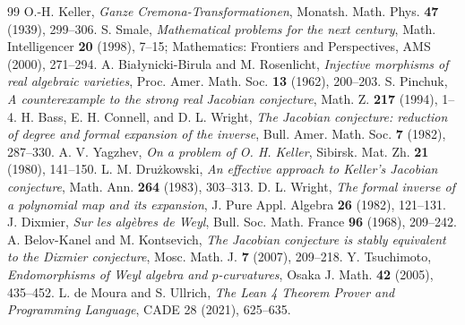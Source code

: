 \documentclass[11pt,a4paper]{article}
\theoremstyle{definition}
\begin{document}
\begin{thebibliography}{99}
 O.-H. Keller, \textit{Ganze Cremona-Transformationen}, Monatsh. Math. Phys. \textbf{47} (1939), 299--306.
 S. Smale, \textit{Mathematical problems for the next century}, Math. Intelligencer \textbf{20} (1998), 7--15; Mathematics: Frontiers and Perspectives, AMS (2000), 271--294.
 A. Bia\l ynicki-Birula and M. Rosenlicht, \textit{Injective morphisms of real algebraic varieties}, Proc. Amer. Math. Soc. \textbf{13} (1962), 200--203.
 S. Pinchuk, \textit{A counterexample to the strong real Jacobian conjecture}, Math. Z. \textbf{217} (1994), 1--4.
 H. Bass, E. H. Connell, and D. L. Wright, \textit{The Jacobian conjecture: reduction of degree and formal expansion of the inverse}, Bull. Amer. Math. Soc. \textbf{7} (1982), 287--330.
 A. V. Yagzhev, \textit{On a problem of O. H. Keller}, Sibirsk. Mat. Zh. \textbf{21} (1980), 141--150.
 L. M. Drużkowski, \textit{An effective approach to Keller's Jacobian conjecture}, Math. Ann. \textbf{264} (1983), 303--313.
 D. L. Wright, \textit{The formal inverse of a polynomial map and its expansion}, J. Pure Appl. Algebra \textbf{26} (1982), 121--131.
 J. Dixmier, \textit{Sur les algèbres de Weyl}, Bull. Soc. Math. France \textbf{96} (1968), 209--242.
 A. Belov-Kanel and M. Kontsevich, \textit{The Jacobian conjecture is stably equivalent to the Dixmier conjecture}, Mosc. Math. J. \textbf{7} (2007), 209--218.
 Y. Tsuchimoto, \textit{Endomorphisms of Weyl algebra and $p$-curvatures}, Osaka J. Math. \textbf{42} (2005), 435--452.
 L. de Moura and S. Ullrich, \textit{The Lean 4 Theorem Prover and Programming Language}, CADE 28 (2021), 625--635.
\end{thebibliography}
\end{document}
